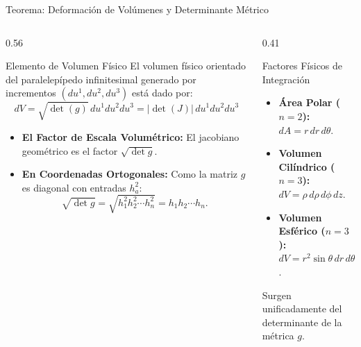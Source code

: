 \documentclass[10pt,aspectratio=169]{beamer}
\begin{document}
\begin{frame}{Teorema: Deformación de Volúmenes y Determinante Métrico}
  \begin{columns}[c]
    \begin{column}{0.56\textwidth}
      \footnotesize
      \begin{block}{Elemento de Volumen Físico}
        El volumen físico orientado del paralelepípedo infinitesimal generado por incrementos $(du^1, du^2, du^3)$ está dado por:
        \[
        \boxed{dV = \sqrt{\det(g)}\, du^1 du^2 du^3 = |\det(J)|\, du^1 du^2 du^3}
        \]
      \end{block}
      \begin{itemize}\itemsep2pt
        \item \textbf{El Factor de Escala Volumétrico:}
        El jacobiano geométrico es el factor $\sqrt{\det g}$.
        \item \textbf{En Coordenadas Ortogonales:}
        Como la matriz $g$ es diagonal con entradas $h_a^2$:
        \[
        \sqrt{\det g} = \sqrt{h_1^2 h_2^2 \cdots h_n^2} = h_1 h_2 \cdots h_n.
        \]
      \end{itemize}
    \end{column}
    \begin{column}{0.41\textwidth}
      \footnotesize
      \begin{block}{Factores Físicos de Integración}
        \scriptsize
        \begin{itemize}\itemsep3pt
          \item \textbf{Área Polar ($n=2$):}
          $dA = r\, dr\, d\theta$.
          \item \textbf{Volumen Cilíndrico ($n=3$):}
          $dV = \rho\, d\rho\, d\phi\, dz$.
          \item \textbf{Volumen Esférico ($n=3$):}
          $dV = r^2\sin\theta\, dr\, d\theta\, d\phi$.
        \end{itemize}
        Surgen unificadamente del determinante de la métrica $g$.
      \end{block}
    \end{column}
  \end{columns}
\end{frame}
\end{document}
